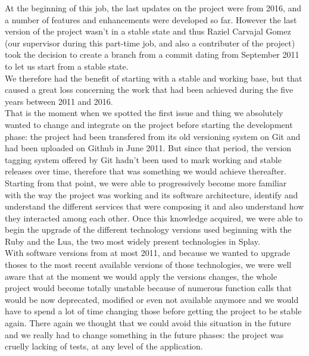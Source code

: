 \documentclass{eplmastersthesis}
\begin{document}
        At the beginning of this job, the last updates on the project were
        from 2016, and a number of features and enhancements were developed
        so far. However the last version of the project wasn't in a stable
        state and thus Raziel Carvajal Gomez (our supervisor during this
        part-time job, and also a contributer of the project) took the decision
        to create a branch from a commit dating from September 2011 to let us
        start from a stable state.\\
        We therefore had the benefit of starting with a stable and working
        base, but that caused a great loss concerning the work that had been
        achieved during the five years between 2011 and 2016.\\
        That is the moment when we spotted the first issue and thing we
        absolutely wanted to change and integrate on the project before
        starting the development phase: the project had been transfered from
        its old versioning system on Git and had been uploaded on Github in
        June 2011. But since that period, the version tagging system offered
        by Git hadn't been used to mark working and stable releases over time,
        therefore that was something we would achieve thereafter.\\

        Starting from that point, we were able to progressively become more
        familiar with the way the project was working and its software
        architecture, identify and understand the different services that
        were composing it and also understand how they interacted among
        each other. Once this knowledge acquired, we were able to begin the
        upgrade of the different technology versions used beginning with the
        Ruby and the Lua, the two most widely present technologies in Splay.\\
        With software versions from at most 2011, and because we wanted
        to upgrade thoses to the most recent available versions of those
        technologies, we were well aware that at the moment we would apply the
        versions changes, the whole project would become totally unstable
        because of numerous function calls that would be now deprecated,
        modified or even not available anymore and we would have to spend a lot
        of time changing those before getting the project to be stable again.
        There again we thought that we could avoid this situation in the future
        and we really had to change something in the future phases: the project
        was cruelly lacking of tests, at any level of the application.\\
\end{document}

